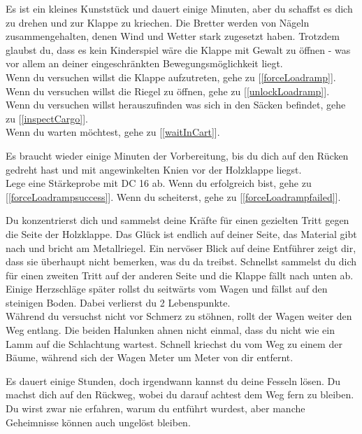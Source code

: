 
Es ist ein kleines Kunststück und dauert einige Minuten, aber du schaffst es dich zu drehen und zur Klappe zu kriechen. Die Bretter werden von Nägeln zusammengehalten, denen Wind und Wetter stark zugesetzt haben. Trotzdem glaubst du, dass es kein Kinderspiel wäre die Klappe mit Gewalt zu öffnen - was vor allem an deiner eingeschränkten Bewegungsmöglichkeit liegt.
\\Wenn du versuchen willst die Klappe aufzutreten, gehe zu [\ref{forceLoadramp}].
\\Wenn du versuchen willst die Riegel zu öffnen, gehe zu [\ref{unlockLoadramp}].
\\Wenn du versuchen willst herauszufinden was sich in den Säcken befindet, gehe zu [\ref{inspectCargo}].
\\Wenn du warten möchtest, gehe zu [\ref{waitInCart}].


Es braucht wieder einige Minuten der Vorbereitung, bis du dich auf den Rücken gedreht hast und mit angewinkelten Knien vor der Holzklappe liegst.\\
Lege eine Stärkeprobe mit DC 16 ab. Wenn du erfolgreich bist, gehe zu [\ref{forceLoadrampsuccess}].
Wenn du scheiterst, gehe zu [\ref{forceLoadrampfailed}].


Du konzentrierst dich und sammelst deine Kräfte für einen gezielten Tritt gegen die Seite der Holzklappe. Das Glück ist endlich auf deiner Seite, das Material gibt nach und bricht am Metallriegel. Ein nervöser Blick auf deine Entführer zeigt dir, dass sie überhaupt nicht bemerken, was du da treibst. Schnellst sammelst du dich für einen zweiten Tritt auf der anderen Seite und die Klappe fällt nach unten ab. Einige Herzschläge später rollst du seitwärts vom Wagen und fällst auf den steinigen Boden. Dabei verlierst du 2 Lebenspunkte.\\
Während du versuchst nicht vor Schmerz zu stöhnen, rollt der Wagen weiter den Weg entlang. Die beiden Halunken ahnen nicht einmal, dass du nicht wie ein Lamm auf die Schlachtung wartest. Schnell kriechst du vom Weg zu einem der Bäume, während sich der Wagen Meter um Meter von dir entfernt.

Es dauert einige Stunden, doch irgendwann kannst du deine Fesseln lösen. Du machst dich auf den Rückweg, wobei du darauf achtest dem Weg fern zu bleiben.
Du wirst zwar nie erfahren, warum du entführt wurdest, aber manche Geheimnisse können auch ungelöst bleiben.

